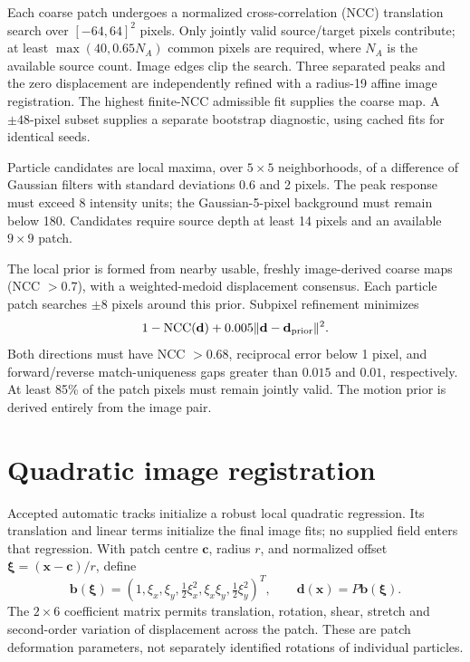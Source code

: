 \documentclass[11pt]{article}
\begin{document}
Each coarse patch undergoes a normalized cross-correlation (NCC) translation search over $[-64,64]^2$ pixels. Only jointly valid source/target pixels contribute; at least $\max(40,0.65N_A)$ common pixels are required, where $N_A$ is the available source count. Image edges clip the search. Three separated peaks and the zero displacement are independently refined with a radius-19 affine image registration. The highest finite-NCC admissible fit supplies the coarse map. A $\pm48$-pixel subset supplies a separate bootstrap diagnostic, using cached fits for identical seeds.

Particle candidates are local maxima, over $5\times5$ neighborhoods, of a difference of Gaussian filters with standard deviations $0.6$ and 2 pixels. The peak response must exceed 8 intensity units; the Gaussian-5-pixel background must remain below 180. Candidates require source depth at least 14 pixels and an available $9\times9$ patch.

The local prior is formed from nearby usable, freshly image-derived coarse maps (NCC $>0.7$), with a weighted-medoid displacement consensus. Each particle patch searches $\pm8$ pixels around this prior. Subpixel refinement minimizes
\[
  1-\operatorname{NCC}(\mathbf d)+0.005\|\mathbf d-\mathbf d_{\rm prior}\|^2.
\]
Both directions must have NCC $>0.68$, reciprocal error below 1 pixel, and forward/reverse match-uniqueness gaps greater than $0.015$ and $0.01$, respectively. At least 85\% of the patch pixels must remain jointly valid. The motion prior is derived entirely from the image pair.

\section{Quadratic image registration}
Accepted automatic tracks initialize a robust local quadratic regression. Its translation and linear terms initialize the final image fits; no supplied field enters that regression. With patch centre $\mathbf c$, radius $r$, and normalized offset $\boldsymbol\xi=(\mathbf x-\mathbf c)/r$, define
\[
 \mathbf b(\boldsymbol\xi)=
 (1,\xi_x,\xi_y,\tfrac12\xi_x^2,\xi_x\xi_y,\tfrac12\xi_y^2)^T,
 \qquad \mathbf d(\mathbf x)=P\mathbf b(\boldsymbol\xi).
\]
The $2\times6$ coefficient matrix permits translation, rotation, shear, stretch and second-order variation of displacement across the patch. These are patch deformation parameters, not separately identified rotations of individual particles.
\end{document}
